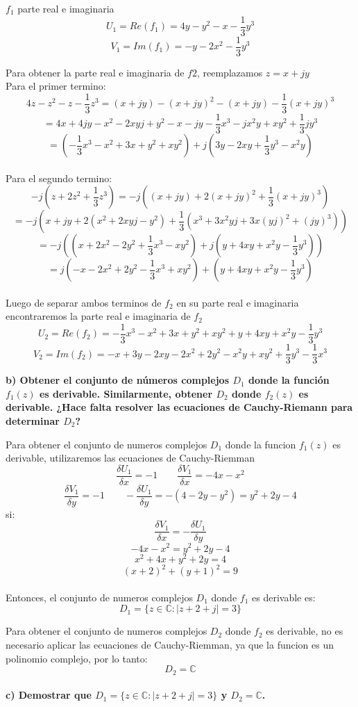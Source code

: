 \documentclass[12pt]{report}
\begin{document}
$f_1$ parte real e imaginaria
$$U_1=Re(f_1)=4y-y^2-x-\frac{1}{3}y^3$$
$$V_1=Im(f_1)=-y-2x^2-\frac{1}{3}y^3$$

Para obtener la parte real e imaginaria de $f2$, reemplazamos $z=x+jy$\\
Para el primer termino:
$$4z - z^2 - z - \frac{1}{3}z^3=(x+jy) - (x+jy)^2 - (x+jy) - \frac{1}{3}(x+jy)^3$$
$$=4x + 4jy -x^2 -2xyj + y^2 -x -jy - \frac{1}{3}x^3 - jx^2y + xy^2 + \frac{1}{3}jy^3$$
$$=(- \frac{1}{3}x^3 -x^2 + 3x + y^2 + xy^2) +j(3y -2xy + \frac{1}{3}y^3 - x^2y )$$ \\
Para el segundo termino:
$$-j (z + 2z^2 + \frac{1}{3}z^3) = -j ((x+jy) + 2(x+jy)^2 + \frac{1}{3}(x+jy)^3)$$
$$=-j (x+jy + 2(x^2+2xyj-y^2) + \frac{1}{3}(x^3 + 3x^2yj + 3x(yj)^2 + (jy)^3))$$
$$=-j ((x + 2x^2 - 2y^2 + \frac{1}{3} x^3 - xy^2) + j( y +4xy + x^2y - \frac{1}{3}y^3))$$
$$=j(-x - 2x^2 + 2y^2 - \frac{1}{3} x^3 + xy^2) + ( y +4xy + x^2y - \frac{1}{3}y^3)$$\\
Luego de separar ambos terminos de $f_2$ en su parte real e imaginaria encontraremos la parte real
e imaginaria de $f_2$
$$U_2=Re(f_2)=- \frac{1}{3}x^3 - x^2 + 3x + y^2 + xy^2 + y +4xy + x^2y - \frac{1}{3}y^3$$
$$V_2=Im(f_2)=-x + 3y -2xy - 2x^2 + 2y^2 - x^2y + xy^2 + \frac{1}{3}y^3 - \frac{1}{3} x^3$$

\textbf{b) Obtener el conjunto de números complejos $D_1$ donde la función $f_1(z)$ es derivable. Similarmente, obtener $D_2$ donde $f_2(z)$ es derivable.
¿Hace falta resolver las ecuaciones de Cauchy-Riemann para determinar $D_2$?}

Para obtener el conjunto de numeros complejos $D_1$ donde la funcion $f_1(z)$ es derivable, utilizaremos las ecuaciones de Cauchy-Riemman
$$\frac{\delta U_1}{\delta x}=-1 \quad \quad \frac{\delta V_1}{\delta x}=-4x-x^2$$
$$\frac{\delta V_1}{\delta y}=-1 \quad \quad - \frac{\delta U_1}{\delta y}=-(4-2y-y^2)=y^2+2y-4$$
si:$$\frac{\delta V_1}{\delta x}=-\frac{\delta U_1}{\delta y}$$
$$-4x-x^2=y^2+2y-4$$
$$x^2+4x+y^2+2y=4$$
$$(x+2)^2+(y+1)^2=9$$\\
Entonces, el conjunto de numeros complejos $D_1$ donde $f_1$ es derivable es:
$$D_1 = \{z \in \mathbb{C} : |z + 2 + j| = 3\}$$

Para obtener el conjunto de numeros complejos $D_2$ donde $f_2$ es derivable, no es necesario aplicar las ecuaciones de Cauchy-Riemman,
ya que la funcion es un polinomio complejo, por lo tanto:
$$D_2=\mathbb{C}$$\\

\textbf{c) Demostrar que $D_1 = \{z \in \mathbb{C} : |z + 2 + j| = 3\}$ y $D_2 = \mathbb{C}$.}
\end{document}
